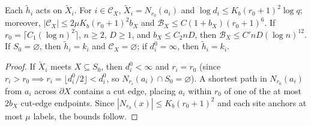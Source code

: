 \begin{lemma}
    \label{thm:al_crossing_budget}
    \leanok
    Each $\widetilde h_i$ acts on $\widetilde X_i$. For $i\in\mathcal C_X$,
    $\widetilde X_i=N_{r_0}(a_i)$ and $\log d_i\le K_b(r_0+1)^2\log q$; moreover,
    $|\mathcal C_X|\le2\mu K_b(r_0+1)^2b_X$ and
    $\mathcal B_X\le C(1+b_X)(r_0+1)^6$. If $r_0=\lceil C_1(\log n)^2\rceil$,
    $n\ge2$, $D\ge1$, and $b_X\le C_2nD$, then
    $\mathcal B_X\le C'nD(\log n)^{12}$. If $S_0=\varnothing$, then
    $\widetilde h_i=k_i$ and $\mathcal C_X=\varnothing$; if $d_i^0=\infty$, then
    $\widetilde h_i=k_i$.
\end{lemma}
\begin{proof}\leanok
    If $\widetilde X_i$ meets $X\subseteq S_0$, then $d_i^0<\infty$ and
    $r_i=r_0$ (since $r_i>r_0\implies r_i=\lfloor d_i^0/2\rfloor<d_i^0$, so
    $N_{r_i}(a_i)\cap S_0=\varnothing$). A shortest path in $N_{r_0}(a_i)$ from
    $a_i$ across $\partial X$ contains a cut edge, placing $a_i$ within $r_0$ of
    one of the at most $2b_X$ cut-edge endpoints. Since $|N_{r_0}(x)|\le K_b(r_0+1)^2$
    and each site anchors at most $\mu$ labels, the bounds follow.
\end{proof}


